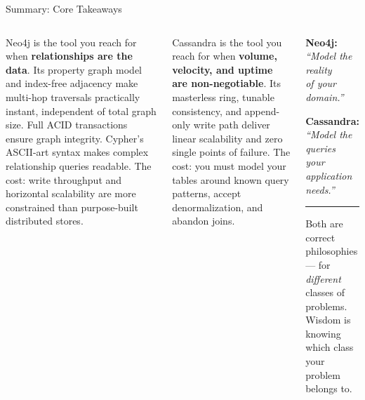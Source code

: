 \documentclass[aspectratio=169]{beamer}
\begin{document}
\begin{frame}{Summary: Core Takeaways}
  \begin{columns}[T]
      \begin{tcolorbox}[neo4jbox, title=Neo4j in One Paragraph]
        \small
        Neo4j is the tool you reach for when \textbf{relationships are the data}. Its property graph model and index-free adjacency make multi-hop traversals practically instant, independent of total graph size. Full ACID transactions ensure graph integrity. Cypher's ASCII-art syntax makes complex relationship queries readable. The cost: write throughput and horizontal scalability are more constrained than purpose-built distributed stores.
      \end{tcolorbox}
      \vspace{0.3cm}
      \begin{tcolorbox}[cassbox, title=Cassandra in One Paragraph]
        \small
        Cassandra is the tool you reach for when \textbf{volume, velocity, and uptime are non-negotiable}. Its masterless ring, tunable consistency, and append-only write path deliver linear scalability and zero single points of failure. The cost: you must model your tables around known query patterns, accept denormalization, and abandon joins.
      \end{tcolorbox}
      \begin{tcolorbox}[infobox, title=The Design Philosophy Difference]
        \normalsize
        \begin{center}
          \textbf{Neo4j:}\\
          \textit{``Model the reality\\of your domain.''}
        \end{center}
        \vspace{0.3cm}
        \begin{center}
          \textbf{Cassandra:}\\
          \textit{``Model the queries\\your application needs.''}
        \end{center}
        \vspace{0.3cm}
        \hrule
        \vspace{0.3cm}
        Both are correct philosophies — for \textit{different} classes of problems. Wisdom is knowing which class your problem belongs to.
      \end{tcolorbox}
  \end{columns}
\end{frame}
\end{document}
